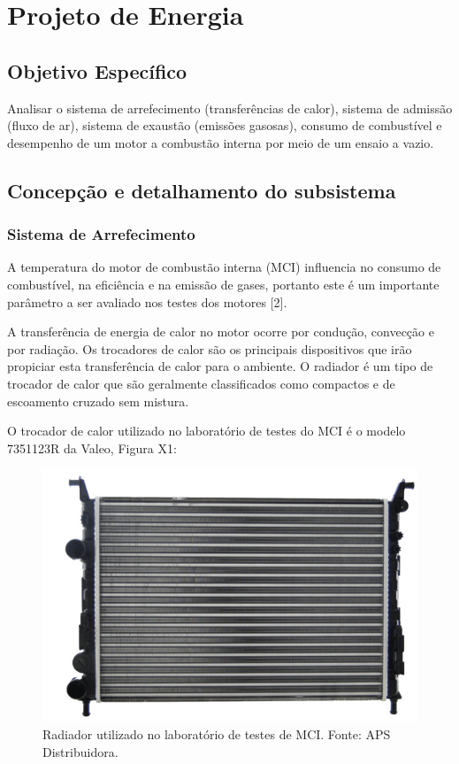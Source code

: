 \chapter[Projeto de Energia]{Projeto de Energia}

\section{Objetivo Específico}

Analisar o sistema de arrefecimento (transferências de calor), sistema de admissão (fluxo de ar), sistema de exaustão (emissões gasosas), consumo de combustível e desempenho de um motor a combustão interna por meio de um ensaio a vazio.

\section{Concepção e detalhamento do subsistema}

\subsection{Sistema de Arrefecimento}

A temperatura do motor de combustão interna (MCI) influencia no consumo de combustível, na eficiência e na emissão de gases, portanto este é um importante parâmetro a ser avaliado nos testes dos motores [2].

A transferência de energia de calor no motor ocorre por condução, convecção e por radiação. Os trocadores de calor são os principais dispositivos que irão propiciar esta transferência de calor para o ambiente. O radiador é um tipo de trocador de calor que são geralmente classificados como compactos e de escoamento cruzado sem mistura.

O trocador de calor utilizado no laboratório de testes do MCI é o modelo 7351123R da Valeo, Figura X1:

\begin{figure}[h!]
	\centering
	\includegraphics[keepaspectratio=true,scale= 0.6]{figuras/radiador.png}
	\caption{Radiador utilizado no laboratório de testes de MCI. Fonte: APS Distribuidora.}
	\label{radiador}
\end{figure}

